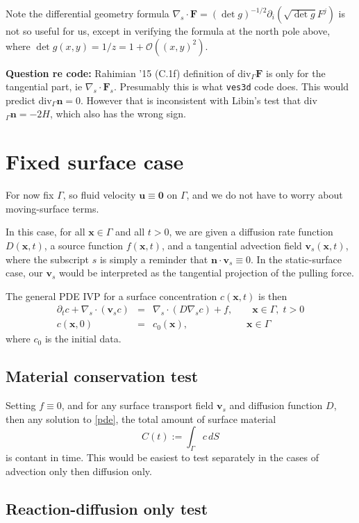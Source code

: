 \documentclass[11pt]{article}
\newcommand{\bea}{\begin{eqnarray}}
\newcommand{\eea}{\end{eqnarray}}
\newcommand{\mbf}[1]{{\mathbf #1}}
\newcommand{\bigO}{{\mathcal O}}
\newcommand{\qqquad}{\qquad\qquad}
\newcommand{\x}{\mbf{x}}
\newcommand{\n}{\mbf{n}}
\newcommand{\vv}{\mbf{v}}
\begin{document}
Note the differential geometry formula
$\nabla_s\cdot\mbf{F} = (\det g)^{-1/2} \partial_i (\sqrt{\det g} F^j)$
is not so useful for us, except in verifying the formula
at the north pole above, where $\det g(x,y) = 1/z = 1 + \bigO((x,y)^2)$.

{\bf Question re code:}
Rahimian '15 (C.1f) definition of div$_\Gamma \mbf{F}$ is only
for the tangential part, ie $\nabla_s \cdot \mbf{F}_s$.
Presumably this is what {\tt ves3d} code does.
This would predict div$_\Gamma\n = 0$.
However that is inconsistent with Libin's test that
div$_\Gamma \n = -2H$, which also has the wrong sign.


\section{Fixed surface case}
\label{s:fixed}

For now fix $\Gamma$, so fluid velocity $\mbf{u}\equiv \mbf{0}$ on $\Gamma$,
and we do not have to worry about moving-surface terms.

In this case,
for all $\x\in\Gamma$ and all $t>0$,
we are given a diffusion rate function $D(\x,t)$,
a source function $f(\x,t)$,
and a tangential advection field $\vv_s(\x,t)$,
where the subscript $s$ is simply a reminder that
$\n\cdot\vv_s\equiv 0$.
In the static-surface case, our $\vv_s$ would be interpreted as the tangential
projection of the pulling force.

The general PDE IVP for a surface concentration $c(\x,t)$ is then
\bea
\partial_t c + \nabla_s \cdot(\vv_s c) &= &\nabla_s \cdot (D \nabla_s c) + f
, \qquad \x\in\Gamma, \;t>0
\label{pde}
\\
c(\x,0) & = & c_0(\x), \qqquad\qquad \x\in\Gamma
\label{ic}
\eea
where $c_0$ is the initial data.

\subsection{Material conservation test}

Setting $f\equiv0$, and for any surface transport
field $\vv_s$ and diffusion function $D$, then any solution to \eqref{pde},
the total amount of surface material
$$
C(t) := \int_\Gamma c \,dS
$$
is contant in time.
This would be easiest to test separately in the cases of advection
only then diffusion only.


\subsection{Reaction-diffusion only test}
\end{document}
